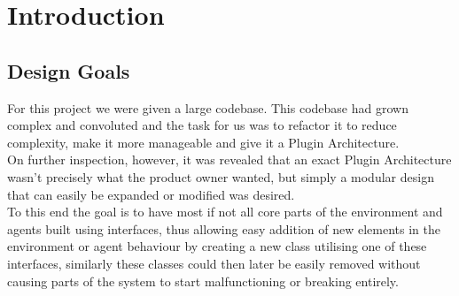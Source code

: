 \chapter{Introduction}
\section{Design Goals}
For this project we were given a large codebase. This codebase had grown complex and convoluted and the task for us was to refactor it to reduce complexity, make it more manageable and give it a Plugin Architecture. \\
On further inspection, however, it was revealed that an exact Plugin Architecture wasn't precisely what the product owner wanted, but simply a modular design that can easily be expanded or modified was desired. \\
To this end the goal is to have most if not all core parts of the environment and agents built using interfaces, thus allowing easy addition of new elements in the environment or agent behaviour by creating a new class utilising one of these interfaces, similarly these classes could then later be easily removed without causing parts of the system to start malfunctioning or breaking entirely. \\

